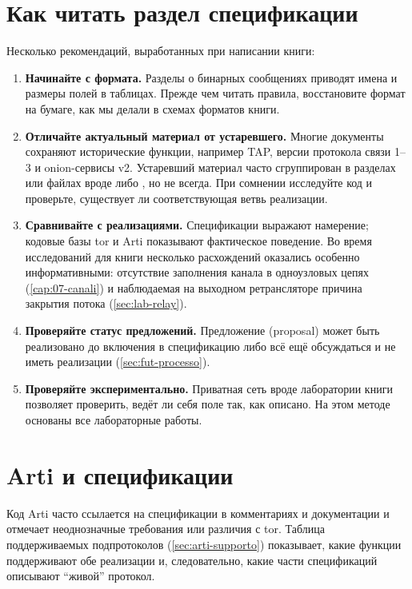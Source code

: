 \section{Как читать раздел спецификации}\label{sec:C-lettura}

Несколько рекомендаций, выработанных при написании книги:
\begin{enumerate}
  \item \textbf{Начинайте с формата.} Разделы о бинарных сообщениях приводят имена и размеры полей в таблицах. Прежде чем читать правила, восстановите формат на бумаге, как мы делали в схемах форматов книги.
  \item \textbf{Отличайте актуальный материал от устаревшего.} Многие документы сохраняют исторические функции, например TAP, версии протокола связи 1--3 и onion-сервисы v2. Устаревший материал часто сгруппирован в разделах или файлах вроде  либо , но не всегда. При сомнении исследуйте код и проверьте, существует ли соответствующая ветвь реализации.
  \item \textbf{Сравнивайте с реализациями.} Спецификации выражают намерение; кодовые базы tor и Arti показывают фактическое поведение. Во время исследований для книги несколько расхождений оказались особенно информативными: отсутствие заполнения канала в одноузловых цепях (\cref{cap:07-canali}) и наблюдаемая на выходном ретрансляторе причина закрытия потока (\cref{sec:lab-relay}).
  \item \textbf{Проверяйте статус предложений.} Предложение (proposal) может быть реализовано до включения в спецификацию либо всё ещё обсуждаться и не иметь реализации (\cref{sec:fut-processo}).
  \item \textbf{Проверяйте экспериментально.} Приватная сеть вроде лаборатории книги позволяет проверить, ведёт ли себя поле так, как описано. На этом методе основаны все лабораторные работы.
\end{enumerate}

\section{Arti и спецификации}\label{sec:C-arti}

Код Arti часто ссылается на спецификации в комментариях и документации и отмечает неоднозначные требования или различия с tor. Таблица поддерживаемых подпротоколов (\cref{sec:arti-supporto}) показывает, какие функции поддерживают обе реализации и, следовательно, какие части спецификаций описывают \enquote{живой} протокол.
